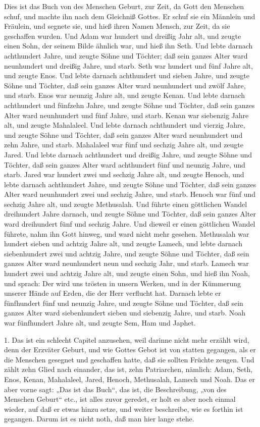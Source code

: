Dies ist das Buch von des Menschen Geburt, zur Zeit, da Gott den Menschen schuf, und machte ihn nach dem Gleichniß Gottes. Er schuf sie ein Männlein und Fräulein, und segnete sie, und hieß ihren Namen Mensch, zur Zeit, da sie geschaffen wurden. Und Adam war hundert und dreißig Jahr alt, und zeugte einen Sohn, der seinem Bilde ähnlich war, und hieß ihn Seth. Und lebte darnach achthundert Jahre, und zeugte Söhne und Töchter; daß sein ganzes Alter ward neunhundert und dreißig Jahre, und starb. Seth war hundert und fünf Jahre alt, und zeugte Enos. Und lebte darnach achthundert und sieben Jahre, und zeugte Söhne und Töchter, daß sein ganzes Alter ward neunhundert und zwölf Jahre, und starb. Enos war neunzig Jahre alt, und zeugte Kenan. Und lebte darnach achthundert und fünfzehn Jahre, und zeugte Söhne und Töchter, daß sein ganzes Alter ward neunhundert und fünf Jahre, und starb. Kenan war siebenzig Jahre alt, und zeugte Mahalaleel. Und lebte darnach achthundert und vierzig Jahre, und zeugte Söhne und Töchter, daß sein ganzes Alter ward neunhundert und zehn Jahre, und starb. Mahalaleel war fünf und sechzig Jahre alt, und zeugte Jared. Und lebte darnach achthundert und dreißig Jahre, und zeugte Söhne und Töchter, daß sein ganzes Alter ward achthundert fünf und neunzig Jahre, und starb. Jared war hundert zwei und sechzig Jahre alt, und zeugte Henoch, und lebte darnach achthundert Jahre, und zeugte Söhne und Töchter, daß sein ganzes Alter ward neunhundert zwei und sechzig Jahre, und starb. Henoch war fünf und sechzig Jahre alt, und zeugte Methusalah. Und führte einen göttlichen Wandel dreihundert Jahre darnach, und zeugte Söhne und Töchter, daß sein ganzes Alter ward dreihundert fünf und sechzig Jahre. Und dieweil er einen göttlichen Wandel führete, nahm ihn Gott hinweg, und ward nicht mehr gesehen. Methusalah war hundert sieben und achtzig Jahre alt, und zeugte Lamech, und lebte darnach siebenhundert zwei und achtzig Jahre, und zeugte Söhne und Töchter, daß sein ganzes Alter ward neunhundert neun und sechzig Jahr, und starb. Lamech war hundert zwei und achtzig Jahre alt, und zeugte einen Sohn, und hieß ihn Noah, und sprach: Der wird uns trösten in unsern Werken, und in der Kümmerung unserer Hände auf Erden, die der Herr verflucht hat. Darnach lebte er fünfhundert fünf und neunzig Jahre, und zeugte Söhne und Töchter, daß sein ganzes Alter ward siebenhundert sieben und siebenzig Jahre, und starb. Noah war fünfhundert Jahre alt, und zeugte Sem, Ham und Japhet.

1. Das ist ein schlecht Capitel anzusehen, weil darinne nicht mehr erzählt wird, denn der Erzväter Geburt, und wie Gottes Gebot ist von statten gegangen, als er die Menschen gesegnet und geschaffen hatte, daß sie sollten Früchte zeugen. Und zählt zehn Glied nach einander, das ist, zehn Patriarchen, nämlich: Adam, Seth, Enos, Kenan, Mahalaleel, Jared, Henoch, Methusalah, Lamech und Noah. Das er aber vorne sagt: „Das ist das Buch“, das ist, die Beschreibung, „von des Menschen Geburt“ etc., ist alles zuvor geredet, er holt es aber noch einmal wieder, auf daß er etwas hinzu setze, und weiter beschreibe, wie es forthin ist gegangen. Darum ist es nicht noth, daß man hier lange stehe.

